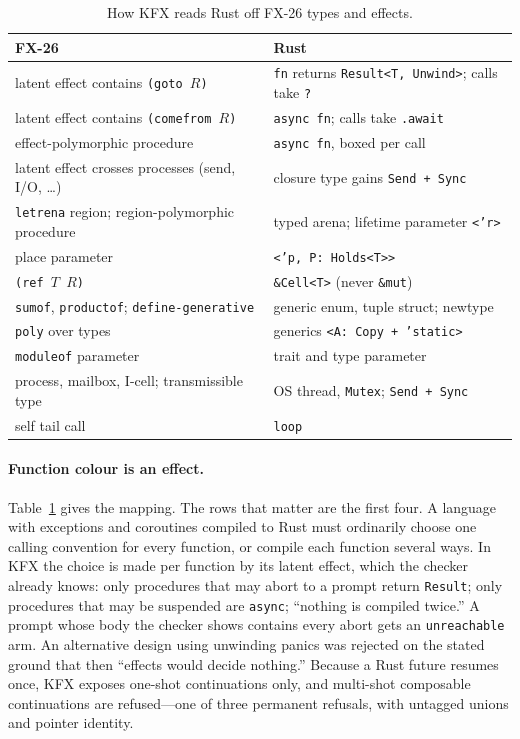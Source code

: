 \documentclass[acmsmall,screen,review]{acmart}
\newcommand{\cd}[1]{\texttt{#1}}
\newcommand{\fx}{FX-26}
\begin{document}
\begin{table}[t]
\caption{How KFX reads Rust off \fx{} types and effects.}
\label{tab:kfx}
\small
\begin{tabular}{@{}ll@{}}
\toprule
\fx & Rust\\
\midrule
latent effect contains \cd{(goto $R$)} & \cd{fn} returns \cd{Result<T, Unwind>}; calls take \cd{?}\\
latent effect contains \cd{(comefrom $R$)} & \cd{async fn}; calls take \cd{.await}\\
effect-polymorphic procedure & \cd{async fn}, boxed per call\\
latent effect crosses processes (send, I/O, \ldots) & closure type gains \cd{Send + Sync}\\
\cd{letrena} region; region-polymorphic procedure & typed arena; lifetime parameter \cd{<'r>}\\
place parameter & \cd{<'p, P:\ Holds<T>>}\\
\cd{(ref $T$ $R$)} & \cd{\&Cell<T>} (never \cd{\&mut})\\
\cd{sumof}, \cd{productof}; \cd{define-generative} & generic enum, tuple struct; newtype\\
\cd{poly} over types & generics \cd{<A:\ Copy + 'static>}\\
\cd{moduleof} parameter & trait and type parameter\\
process, mailbox, I-cell; transmissible type & OS thread, \cd{Mutex}; \cd{Send + Sync}\\
self tail call & \cd{loop}\\
\bottomrule
\end{tabular}
\end{table}

\paragraph{Function colour is an effect.} Table~\ref{tab:kfx} gives the
mapping. The rows that matter are the first four. A language with
exceptions and coroutines compiled to Rust must ordinarily choose one
calling convention for every function, or compile each function
several ways. In KFX the choice is made per function by its latent
effect, which the checker already knows: only procedures that may abort
to a prompt return \cd{Result}; only procedures that may be suspended
are \cd{async}; ``nothing is compiled twice.'' A prompt whose body the
checker shows contains every abort gets an \cd{unreachable} arm. An
alternative design using unwinding panics was rejected on the stated
ground that then ``effects would decide nothing.'' Because a Rust
future resumes once, KFX exposes one-shot continuations only, and
multi-shot composable continuations are refused---one of three
permanent refusals, with untagged unions and pointer identity.
\end{document}
